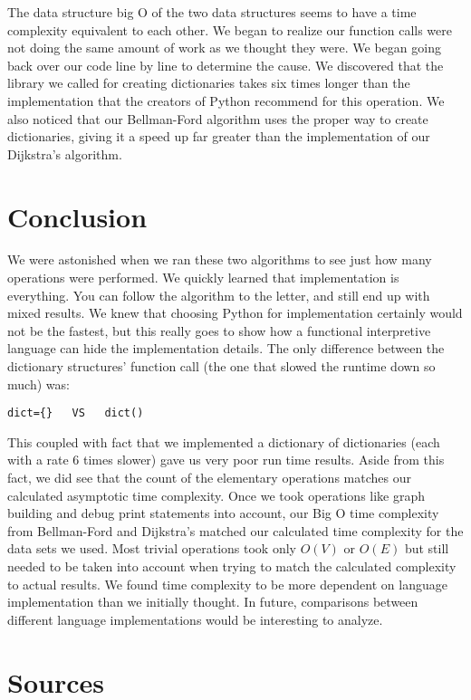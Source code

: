 \documentclass{article}
\begin{document}
The data structure big O of the two data structures seems to have a time complexity equivalent to each other. 
We began to realize our function calls were not doing the same amount of work as we thought they were. We began going back over our code line by line to determine the cause. We discovered that the library we called for creating dictionaries takes six times longer than the implementation that the creators of Python recommend for this operation. We also noticed that our Bellman-Ford algorithm uses the proper way to create dictionaries, giving it a speed up far greater than the implementation of our Dijkstra's algorithm.

\pagebreak
\section{Conclusion}
We were astonished when we ran these two algorithms to see just how many operations were performed. We quickly learned that implementation is everything. You can follow the algorithm to the letter, and still end up with mixed results. We knew that choosing Python for implementation certainly would not be the fastest, but this really goes to show how a functional interpretive language can hide the implementation details. The only difference between the dictionary structures' function call (the one that slowed the runtime down so much) was:

\begin{verbatim}
dict={}   VS   dict()
\end{verbatim}

This coupled with fact that we implemented a dictionary of dictionaries (each with a rate 6 times slower) gave us very poor run time results.  Aside from this fact, we did see that the count of the elementary operations matches our calculated asymptotic time complexity. Once we took operations like graph building and debug print statements into account, our Big O time complexity from Bellman-Ford and Dijkstra's matched our calculated time complexity for the data sets we used. Most trivial operations took only $O(V)$ or $O(E)$ but still needed to be taken into account when trying to match the calculated complexity to actual results.  We found time complexity to be more dependent on language implementation than we initially thought.  In future, comparisons between different language implementations would be interesting to analyze.
\section{Sources}
\end{document}
